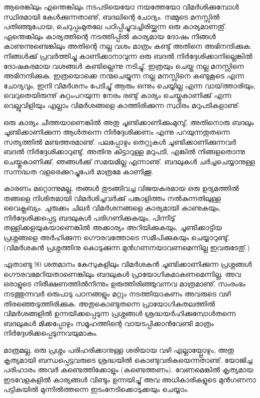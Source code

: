 ﻿

\vskip 2pt

ആരെങ്കിലും എന്തെങ്കിലും നടപടിയെയോ നയത്തേയോ വിമര്‍ശിക്കുമ്പോള്‍ സ്ഥിരമായി കേള്‍ക്കുന്നതാണു്, ബദലിന്റെ ചോദ്യം. 
നമ്മുടെ മനസ്സില്‍ പതിഞ്ഞുപോയ, ചെറുപ്പംമുതലേ പഠിപ്പിച്ചുവച്ചിരിയ്ക്കുന്ന ഒരു കാര്യമാണതു്. എന്തെങ്കിലും കാര്യത്തിന്റെ നടത്തിപ്പില്‍ 
കാര്യമായ ദോഷം നിങ്ങള്‍ കാണുന്നുണ്ടെങ്കിലും അതിന്റെ നല്ല വശം മാത്രം കണ്ടു് അതിനെ അഭിനന്ദിക്കുക. നിങ്ങള്‍ക്കു് പ്രവര്‍ത്തിച്ചു
 കാണിക്കാനാവുന്ന ഒരു ബദല്‍ നിര്‍ദ്ദേശിക്കാനില്ലെങ്കില്‍ ദോഷകരമായ വശങ്ങള്‍ കണ്ടില്ലെന്നു നടിച്ചു്, ഇത്രയും ചെയ്ത നല്ല മനസ്സിനെ 
 അഭിനന്ദിക്കുക. ഇത്രയൊക്കെ നന്മചെയ്യുന്ന നല്ല മനസ്സിനെ കണ്ടുകൂടെ എന്ന ചോദ്യവും, ഇനി വിമര്‍ശനം പേടിച്ചു് ആരും ഒന്നും ചെയ്യില്ല 
 എന്ന വായ്‌ത്താരിയും, വെറുതെയിരുന്നു് കുറ്റംപറയുന്ന നേരം രണ്ടു് കാര്യം ചെയ്തുകാണിക്കു് എന്ന വെല്ലുവിളിയും എല്ലാം വിമര്‍ശങ്ങളെ 
 കാത്തിരിക്കുന്ന സ്ഥിരം മറുപടികളാണു്.

ഒരു കാര്യം ചീത്തയാണെങ്കില്‍ അതു ചൂണ്ടിക്കാണിക്കുംമുമ്പു്, അതിനൊരു ബദലും ചൂണ്ടിക്കാണിക്കുന്ന ആള്‍തന്നെ നിര്‍ദ്ദേശിക്കണം 
എന്നു പറയുന്നതുതന്നെ സത്യത്തില്‍ മണ്ടത്തരമാണു്. പലപ്പോഴും തെറ്റുകള്‍ ചൂണ്ടിക്കാണിക്കുന്നവര്‍ ബദല്‍ നിര്‍ദ്ദേശിക്കാറുണ്ടു്. 
അതിനു കിട്ടാറുള്ള മറുപടി, എങ്കില്‍ നിങ്ങളതൊന്നു ചെയ്തുകാണിക്കു്, ഞങ്ങള്‍ക്കു് സമയമില്ല എന്നാണു്. ബദലുകള്‍ ചര്‍ച്ചചെയ്യാനുള്ള
 സന്നദ്ധത വളരെക്കുറച്ചുപേര്‍ മാത്രമേ കാണിക്കൂ.

കാരണം മറ്റൊന്നുമല്ല, തങ്ങള്‍ തുടങ്ങിവച്ച വിജയകരമായ ഒരു ഉദ്യമത്തില്‍ തങ്ങളെ നിശിതമായി വിമര്‍ശിച്ചവര്‍ക്കു് പങ്കാളിത്തം
 നല്‍കുന്നതിലുള്ള വൈക്ലബ്യം. ചുരുക്കം ചിലര്‍ വിമര്‍ശനങ്ങളെ കാര്യമായി കാണുകയും, നിര്‍ദ്ദേശിക്കപ്പെട്ട ബദലുകള്‍ 
 പരിഗണിക്കുകയും, പിന്നീടു് തള്ളിക്കളയുകയാണെങ്കില്‍ അക്കാര്യം അറിയിക്കുകയും, ചൂണ്ടിക്കാട്ടിയ പ്രശ്നങ്ങളെ അര്‍ഹിക്കുന്ന 
 ഗൌരവത്തോടെ സമീപിക്കുകയും ചെയ്യാറുണ്ടു്. (വിമര്‍ശകന്‍ പ്രശ്നത്തിനു കൊടുക്കുന്ന മുന്‍ഗണനയാവണമെന്നില്ല ഇവരുടേതു്.)

ഏതാണ്ടു 90 ശതമാനം കേസുകളിലും വിമര്‍ശകന്‍ ചൂണ്ടിക്കാണിക്കുന്ന പ്രശ്നങ്ങള്‍ ഗൌരവമേറിയതാണെങ്കിലും ബദലുകള്‍ 
പ്രായോഗികമാകണമെന്നില്ല. അവ ഒരാളുടെ നിരീക്ഷണത്തില്‍നിന്നും ഉരുത്തിരിഞ്ഞുവന്നവ മാത്രമാണു്. 
സംരംഭം നടത്തുന്നവര്‍ ഒരുപാടു പഠനങ്ങളും മറ്റും നടത്തിയാകണം അവരുടെ വഴി തിരഞ്ഞെടുത്തിരിക്കുക. അതുകൊണ്ടുതന്നെ
 പ്രായോഗികതലത്തില്‍ വിമര്‍ശങ്ങളില്‍ ഉന്നയിക്കപ്പെടുന്ന പ്രശ്നങ്ങള്‍ ശ്രദ്ധയര്‍ഹിക്കുമ്പോള്‍തന്നെ ബദലുകള്‍ മിക്കപ്പോഴും 
 സമൂഹത്തിന്റെ വായടപ്പിക്കാന്‍വേണ്ടി മാത്രം നിര്‍ദ്ദേശിക്കപ്പെടുന്നവയുമാകും.

മാത്രമല്ല, ഒരു പ്രശ്നം പരിഹരിക്കാനുള്ള ശരിയായ വഴി എല്ലായ്പ്പോഴും, അതു കൃത്യമായി ബന്ധപ്പെട്ടവരുടെ ശ്രദ്ധയില്‍ 
കൊണ്ടുവരികയെന്നതാണു്. യോജിച്ച പരിഹാരം അവര്‍ കണ്ടെത്തിക്കോളും (കണ്ടെത്തണം). വേണമെങ്കില്‍ കൃത്യമായ ഇടവേളകളില്‍ 
കാര്യങ്ങള്‍ വിണ്ടും ഉന്നയിച്ചു് അവ അധികാരികളുടെ മുന്‍ഗണനാ പട്ടികയില്‍ മുന്നില്‍ത്തന്നെ ഇടംനേടിക്കൊടുക്കയും ചെയ്യാം.

